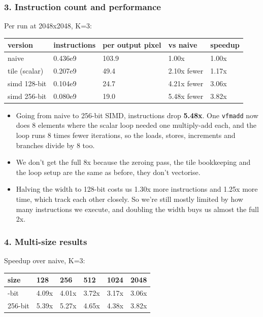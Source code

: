 \documentclass[
  10pt,
]{article}
\newcounter{none} %
\providecommand{\tightlist}{%
  \setlength{\itemsep}{0pt}\setlength{\parskip}{0pt}}
\begin{document}
\subsubsection{3. Instruction count and
performance}\label{instruction-count-and-performance}

Per run at 2048x2048, K=3:

{\def\LTcaptype{none} %
\begin{longtable}[]{@{}lllll@{}}
\toprule\noalign{}
version & instructions & per output pixel & vs naive & speedup \\
\midrule\noalign{}
\endhead
\bottomrule\noalign{}
\endlastfoot
naive & 0.436e9 & 103.9 & 1.00x & 1.00x \\
tile (scalar) & 0.207e9 & 49.4 & 2.10x fewer & 1.17x \\
simd 128-bit & 0.104e9 & 24.7 & 4.21x fewer & 3.06x \\
simd 256-bit & 0.080e9 & 19.0 & 5.48x fewer & 3.82x \\
\end{longtable}
}

\begin{itemize}
\tightlist
\item
  Going from naive to 256-bit SIMD, instructions drop \textbf{5.48x}. One
  \texttt{vfmadd} now does 8 elements where the scalar loop needed one
  multiply-add each, and the loop runs 8 times fewer iterations, so the
  loads, stores, increments and branches divide by 8 too.

\item
  We don't get the full 8x because the zeroing pass, the tile bookkeeping
  and the loop setup are the same as before, they don't vectorise.

\item
  Halving the width to 128-bit costs us 1.30x more instructions and 1.25x
  more time, which track each other closely. So we're still mostly limited
  by how many instructions we execute, and doubling the width buys us
  almost the full 2x.
\end{itemize}

\subsubsection{4. Multi-size results}\label{multi-size-results}

Speedup over naive, K=3:

{\def\LTcaptype{none} %
\begin{longtable}[]{@{}llllll@{}}
\toprule\noalign{}
size & 128 & 256 & 512 & 1024 & 2048 \\
\midrule\noalign{}
\endhead
\bottomrule\noalign{}
\endlastfoot
128-bit & 4.09x & 4.01x & 3.72x & 3.17x & 3.06x \\
256-bit & 5.39x & 5.27x & 4.65x & 4.38x & 3.82x \\
\end{longtable}
}
\end{document}
